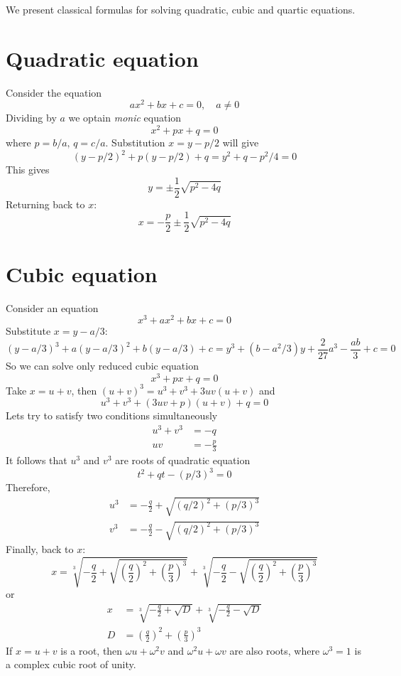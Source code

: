 \documentclass[a4paper, 12pt]{article}
\begin{document}
We present classical formulas for solving quadratic, cubic and quartic equations.

\section{Quadratic equation}
Consider the equation  
\[
    ax^2+bx+c=0, \quad a\neq 0
\]
Dividing by $a$ we optain \textit{monic} equation
\[
    x^2+px+q=0
\] 
where $p=b/a,\,q=c/a$. Substitution $x=y-p/2$ will give
\[
    (y-p/2)^2+p(y-p/2)+q=y^2+q-p^2/4=0
\]
This gives
\[
    y=\pm\frac{1}{2}\sqrt{p^2-4q}
\]
Returning back to $x$:
\[
    x = -\frac{p}{2}\pm\frac{1}{2}\sqrt{p^2-4q}
\]
\section{Cubic equation}
Consider an equation
\[
    x^3+ax^2+bx+c=0
\]
Substitute $x=y-a/3$:
\[
    (y-a/3)^3+a(y-a/3)^2+b(y-a/3)+c=y^3+(b-a^2/3)y+\frac{2}{27}a^3-\frac{ab}{3}+c=0
\]
So we can solve only reduced cubic equation
\[
x^3+px+q=0    
\] 
Take $x=u+v$, then $(u+v)^3=u^3+v^3+3uv(u+v)$ and
\[
u^3+v^3+(3uv+p)(u+v)+q=0    
\]
Lets try to satisfy two conditions simultaneously
\begin{align*}
    u^3+v^3 &= -q\\
    uv &= -\frac{p}{3}
\end{align*}
It follows that $u^3$ and $v^3$ are roots of quadratic
equation 
\[
    t^2+qt-(p/3)^3=0
\]
Therefore,
\begin{align*}
    u^3 &= -\frac{q}{2}+\sqrt{(q/2)^2+(p/3)^3}\\
    v^3 &= -\frac{q}{2}-\sqrt{(q/2)^2+(p/3)^3}
\end{align*}
Finally, back to $x$:
\[
    x=\sqrt[3]{-\frac{q}{2}+\sqrt{\left(\frac{q}{2}\right)^2+\left(\frac{p}{3}\right)^3}}+\sqrt[3]{-\frac{q}{2}-\sqrt{\left(\frac{q}{2}\right)^2+\left(\frac{p}{3}\right)^3}}
\]
or 
\begin{align*}
    x&=\sqrt[3]{-\frac{q}{2}+\sqrt{D}}+\sqrt[3]{-\frac{q}{2}-\sqrt{D}}\\
    D&=\left(\frac{q}{2}\right)^2+\left(\frac{p}{3}\right)^3
\end{align*}
If $x=u+v$ is a root, then $\omega u + \omega^2 v$ and $\omega^2 u+\omega v$ are also roots, where $\omega^3=1$ is a complex cubic root of unity.
\end{document}
